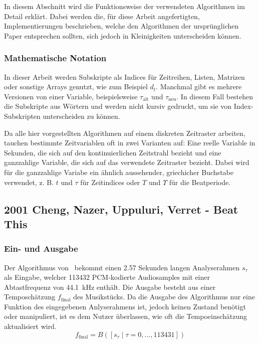 {


	In diesem Abschnitt wird die Funktionsweise der verwendeten Algorithmen im Detail erklärt.
	Dabei werden die, für diese Arbeit angefertigten, Implementierungen beschrieben,
		welche den Algorithmen der ursprünglichen Paper entsprechen sollten,
		sich jedoch in Kleinigkeiten unterscheiden können.

	\subsubsection*{Mathematische Notation}
	{
		In dieser Arbeit werden Subskripte als Indices für Zeitreihen, Listen, Matrizen oder sonstige Arrays genutzt,
			wie zum Beispiel $d_t$.
		Manchmal gibt es mehrere Versionen von einer Variable,
			beispielsweise $\tau_\text{alt}$ und $\tau_\text{neu}$.
		In diesem Fall bestehen die Subskripte aus Wörtern und werden nicht kursiv gedruckt,
			um sie von Index-Subskripten unterscheiden zu können.

		Da alle hier vorgestellten Algorithmen auf einem diskreten Zeitraster arbeiten,
			tauchen bestimmte Zeitvariablen oft in zwei Varianten auf:
		Eine reelle Variable in Sekunden,
			die sich auf den kontinuierlichen Zeitstrahl bezieht
			und eine ganzzahlige Variable,
			die sich auf das verwendete Zeitraster bezieht.
		Dabei wird für die ganzzahlige Variabe ein ähnlich aussehender, griechicher Buchstabe verwendet,
			z. B. $t$ und $\tau$ für Zeitindices
			oder $T$ und $\Upsilon$ für die Beatperiode.
	}

	\subsection{2001 Cheng, Nazer, Uppuluri, Verret - Beat This}
	{
		\subsubsection*{Ein- und Ausgabe}
		{
			Der Algorithmus von~\cite{2001_BeatThis} bekommt einen \num{2.57} Sekunden langen Analyserahmen $s_\tau$ als Eingabe,
				welcher \num{113432} PCM-kodierte Audiosamples mit einer Abtastfrequenz von \SI{44.1}{\kilo\hertz} enthält.
			Die Ausgabe besteht aus einer Temposchätzung $f_\text{final}$ des Musikstücks.
			Da die Ausgabe des Algorithmus nur eine Funktion des eingegebenen Anlyserahmens ist,
				jedoch keinen Zustand benötigt oder manipuliert,
				ist es dem Nutzer überlassen,
				wie oft die Tempoeinschätzung aktualisiert wird.
			\begin{equation}
				f_\text{final} = B([s_\tau \mid \tau = 0, ..., 113431])
			\end{equation}
		}

}}
